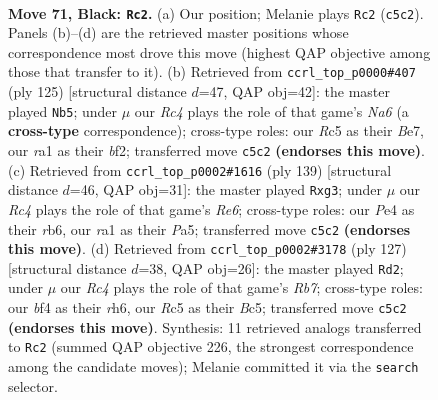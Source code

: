 \documentclass[11pt]{article}
\begin{document}
\clearpage

\begin{figure}[p]\centering
\begin{subfigure}{0.46\textwidth}\centering
\resizebox{\linewidth}{!}{%
\newchessgame
\chessboard[
  setfen={7K/n1P1k3/p7/P1r2p1p/4pBb1/6P1/8/RN6 b - - 49 71},
  showmover=false,
  pgfstyle=straightmove, color=movearrow, markmove={c5-c2}
]}
\caption{}
\end{subfigure}\hfill
\begin{subfigure}{0.46\textwidth}\centering
\resizebox{\linewidth}{!}{%
\newchessgame
\chessboard[
  setfen={5k2/4b3/2r3p1/7p/1p1R3P/nB6/2P2BK1/8 b - - 7 63},
  showmover=false,
  pgfstyle=straightmove, color=movearrow, markmove={a3-b5}
]}
\caption{}
\end{subfigure}
\\[4pt]
\begin{subfigure}{0.46\textwidth}\centering
\resizebox{\linewidth}{!}{%
\newchessgame
\chessboard[
  setfen={8/8/1R6/p1pBp1k1/P1PbP3/4r1P1/KP6/8 b - - 0 70},
  showmover=false,
  pgfstyle=straightmove, color=movearrow, markmove={e3-g3}
]}
\caption{}
\end{subfigure}\hfill
\begin{subfigure}{0.46\textwidth}\centering
\resizebox{\linewidth}{!}{%
\newchessgame
\chessboard[
  setfen={8/5k2/1pB4R/p1b3p1/P7/4P1K1/1r3P2/8 b - - 11 64},
  showmover=false,
  pgfstyle=straightmove, color=movearrow, markmove={b2-d2}
]}
\caption{}
\end{subfigure}
\caption{\textbf{Move 71, Black: \texttt{Rc2}.} (a) Our position; Melanie plays \texttt{Rc2} (\texttt{c5c2}). Panels (b)--(d) are the retrieved master positions whose correspondence most drove this move (highest QAP objective among those that transfer to it). (b) Retrieved from \texttt{ccrl\_top\_p0000\#407} (ply 125) [structural distance $d$=47, QAP obj=42]: the master played \texttt{Nb5}; under $\mu$ our \emph{Rc4} plays the role of that game's \emph{Na6} (a \textbf{cross-type} correspondence); cross-type roles: our \emph{R}c5 as their \emph{B}e7, our \emph{r}a1 as their \emph{b}f2; transferred move \texttt{c5c2} \textbf{(endorses this move)}. (c) Retrieved from \texttt{ccrl\_top\_p0002\#1616} (ply 139) [structural distance $d$=46, QAP obj=31]: the master played \texttt{Rxg3}; under $\mu$ our \emph{Rc4} plays the role of that game's \emph{Re6}; cross-type roles: our \emph{P}e4 as their \emph{r}b6, our \emph{r}a1 as their \emph{P}a5; transferred move \texttt{c5c2} \textbf{(endorses this move)}. (d) Retrieved from \texttt{ccrl\_top\_p0002\#3178} (ply 127) [structural distance $d$=38, QAP obj=26]: the master played \texttt{Rd2}; under $\mu$ our \emph{Rc4} plays the role of that game's \emph{Rb7}; cross-type roles: our \emph{b}f4 as their \emph{r}h6, our \emph{R}c5 as their \emph{B}c5; transferred move \texttt{c5c2} \textbf{(endorses this move)}. Synthesis: 11 retrieved analogs transferred to \texttt{Rc2} (summed QAP objective 226, the strongest correspondence among the candidate moves); Melanie committed it via the \texttt{search} selector.}
\label{fig:thought-m141}
\end{figure}
\end{document}

